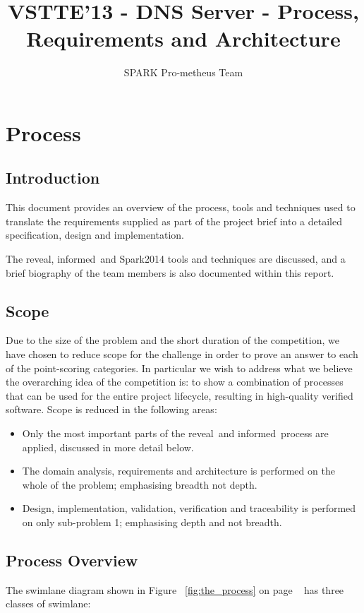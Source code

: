 \documentclass{report}
\title{VSTTE'13 - DNS Server - Process, Requirements and Architecture}
\author{SPARK Pro-metheus Team}
\newcommand{\shouldDo}[1]{\todo[color=orange!40]{SHOULD: #1}}
\newcommand{\spark}[0]{{\sc Spark}}
\newcommand{\reveal}[0]{{\sc reveal}\texttrademark}
\newcommand{\informed}[0]{{\sc informed}}
\begin{document}
\maketitle
\tableofcontents

\chapter{Process}
\section{Introduction}
This document provides an overview of the process, tools and
techniques used to translate the requirements supplied as
part of the project brief into a detailed specification, design
and implementation.

The \reveal, \informed\ and \spark 2014 tools and techniques are
discussed, and a brief biography of the team members is also
documented within this report.

\section{Scope}
Due to the size of the problem and the short duration of the
competition, we have chosen to reduce scope for the challenge in order
to prove an answer to each of the point-scoring categories. In
particular we wish to address what we believe the overarching idea of
the competition is: to show a combination of processes that can be
used for the entire project lifecycle, resulting in high-quality
verified software. Scope is reduced in the following areas:

\begin{itemize}
\item Only the most important parts of the \reveal\ and \informed\
  process are applied, discussed in more detail below.

\item The domain analysis, requirements and architecture is performed
  on the whole of the problem; emphasising breadth not depth.

\item Design, implementation, validation, verification and
  traceability is performed on only sub-problem 1\shouldDo{and maybe
    sub-problem 4}; emphasising depth and not breadth.
\end{itemize}

\section{Process Overview}
The swimlane diagram shown in Figure ~\ref{fig:the_process} on page
~\pageref{fig:the_process} has three classes of swimlane:
\end{document}

